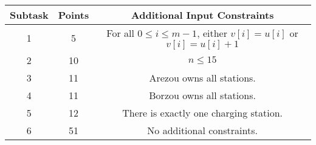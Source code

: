 \begin{center}
\renewcommand{\arraystretch}{1.5}
\begin{tabular}{|c|c|c|}
\hline
Subtask & Points & Additional Input Constraints\\
\hline
1 &  5 & For all $0 \le i \le m - 1$, either $v[i] = u[i]$ or $v[i] = u[i] + 1$ \\
\hline
2 & 10 & $n \leq 15$ \\
\hline
3 & 11 & Arezou owns all stations. \\
\hline
4 & 11 & Borzou owns all stations. \\
\hline
5 & 12 & There is exactly one charging station. \\
\hline
6 & 51 & No additional constraints. \\
\hline
\end{tabular}
\end{center}